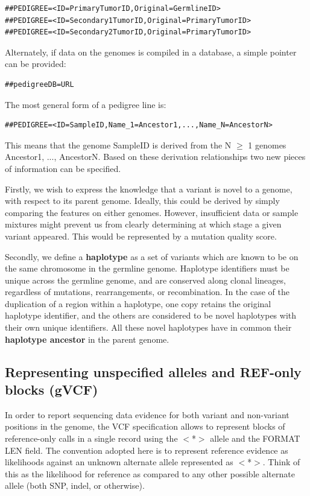 \documentclass[8pt]{article}
\begin{document}
\begin{verbatim}
##PEDIGREE=<ID=PrimaryTumorID,Original=GermlineID>
##PEDIGREE=<ID=Secondary1TumorID,Original=PrimaryTumorID>
##PEDIGREE=<ID=Secondary2TumorID,Original=PrimaryTumorID>
\end{verbatim}

Alternately, if data on the genomes is compiled in a database, a simple pointer can be provided:

\begin{verbatim}
##pedigreeDB=URL
\end{verbatim}

\begin{samepage}
The most general form of a pedigree line is:

\begin{verbatim}
##PEDIGREE=<ID=SampleID,Name_1=Ancestor1,...,Name_N=AncestorN>
\end{verbatim}
\end{samepage}

This means that the genome SampleID is derived from the N $\ge$ 1 genomes Ancestor1, ..., AncestorN.
Based on these derivation relationships two new pieces of information can be specified.

Firstly, we wish to express the knowledge that a variant is novel to a genome, with respect to its parent genome.
Ideally, this could be derived by simply comparing the features on either genomes.
However, insufficient data or sample mixtures might prevent us from clearly determining at which stage a given variant appeared. This would be represented by a mutation quality score.

Secondly, we define a \textbf{haplotype} as a set of variants which are known to be on the same chromosome in the germline genome.
Haplotype identifiers must be unique across the germline genome, and are conserved along clonal lineages, regardless of mutations, rearrangements, or recombination.
In the case of the duplication of a region within a haplotype, one copy retains the original haplotype identifier, and the others are considered to be novel haplotypes with their own unique identifiers.
All these novel haplotypes have in common their \textbf{haplotype ancestor} in the parent genome.

\pagebreak
\subsection{Representing unspecified alleles and REF-only blocks (gVCF)}
\label{unspecified-allele}
In order to report sequencing data evidence for both variant and non-variant positions in the genome, the VCF specification allows to represent blocks of reference-only calls in a single record using the $<$*$>$ allele and the FORMAT LEN field.
The convention adopted here is to represent reference evidence as likelihoods against an unknown alternate allele represented as $<$*$>$.
Think of this as the likelihood for reference as compared to any other possible alternate allele (both SNP, indel, or otherwise).
\end{document}
